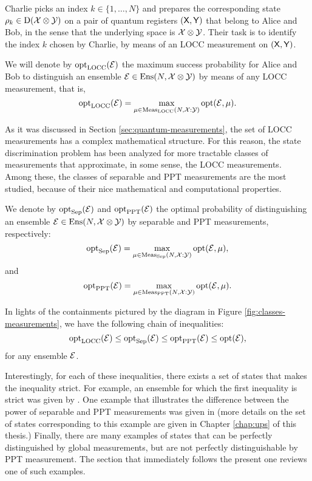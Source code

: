 Charlie picks an index $k \in \{1, \ldots, N\}$ and prepares the corresponding 
state $\rho_{k} \in \mathrm{D}(\mathcal{X}\otimes\mathcal{Y})$ on a pair of quantum registers 
$(\mathsf{X},\mathsf{Y})$ that belong to Alice and Bob, in the sense that the 
underlying space is $\mathcal{X}\otimes\mathcal{Y}$.
Their task is to identify the index $k$ chosen by Charlie, by means of an LOCC 
measurement on $(\mathsf{X},\mathsf{Y})$.

We will denote by $\operatorname{opt}_{\mathrm{LOCC}}(\mathcal{E})$ the maximum success probability for
Alice and Bob to distinguish an ensemble $\mathcal{E}\in\mathrm{Ens}(N, \mathcal{X}\otimes\mathcal{Y})$ by means of 
any LOCC measurement, that is, 
\begin{equation}
\label{eq:opt-LOCC}
  \operatorname{opt}_{\mathrm{LOCC}}(\mathcal{E}) = \max_{\mu \in \mathrm{Meas}_{\mathrm{LOCC}}(N, \mathcal{X}:\mathcal{Y})}\operatorname{opt}(\mathcal{E}, \mu).
\end{equation}

As it was discussed in Section \ref{sec:quantum-measurements}, the set of 
LOCC measurements has a complex mathematical structure.
For this reason, the state discrimination problem has been analyzed for more 
tractable classes of measurements that approximate, in some sense, 
the LOCC measurements.
Among these, the classes of separable and PPT measurements are the most studied,
because of their nice mathematical and computational properties.

We denote by $\operatorname{opt}_{\mathrm{Sep}}(\mathcal{E})$ and $\operatorname{opt}_{\mathrm{PPT}}(\mathcal{E})$ the optimal probability of
distinguishing an ensemble 
$
  \mathcal{E} \in \mathrm{Ens}(N, \mathcal{X}\otimes\mathcal{Y})
$ 
by separable and PPT measurements, respectively:
\begin{equation}
\label{eq:opt-Sep}
  \operatorname{opt}_{\mathrm{Sep}}(\mathcal{E}) = \max_{\mu \in \mathrm{Meas}_{\mathrm{Sep}}(N, \mathcal{X}:\mathcal{Y})}\operatorname{opt}(\mathcal{E}, \mu),
\end{equation}
and
\begin{equation}
\label{eq:opt-PPT}
  \operatorname{opt}_{\mathrm{PPT}}(\mathcal{E}) = \max_{\mu \in \mathrm{Meas}_{\mathrm{PPT}}(N, \mathcal{X}:\mathcal{Y})}\operatorname{opt}(\mathcal{E}, \mu).
\end{equation}


In lights of the containments pictured by the diagram in Figure \ref{fig:classes-measurements},
we have the following chain of inequalities:  
\begin{equation}
\label{eq:inequality-chain}
  \operatorname{opt}_{\mathrm{LOCC}}(\mathcal{E}) \leq \operatorname{opt}_{\mathrm{Sep}}(\mathcal{E}) \leq \operatorname{opt}_{\mathrm{PPT}}(\mathcal{E}) \leq \operatorname{opt}(\mathcal{E}),
\end{equation}
for any ensemble $\mathcal{E}$.

Interestingly, for each of these inequalities, there exists a set of states 
that makes the inequality strict. For example, an ensemble for which the first 
inequality is strict was given by \cite{Bennett99}.
One example that illustrates the difference between the power of separable and 
PPT measurements was given in \cite{Terhal01} (more details on the set of states
corresponding to this example are given in Chapter \ref{chap:ups} of this thesis.)
Finally, there are many examples of states that can be perfectly distinguished by 
global measurements, but are not perfectly distinguishable by PPT measurement.
The section that immediately follows the present one reviews one of such examples.

